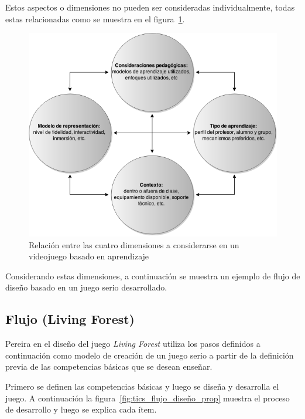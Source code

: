 Estos aspectos o dimensiones no pueden ser consideradas individualmente, todas
estas relacionadas  como se muestra en el
figura~\ref{fig:desarrollo_dimensiones}.

\begin{figure}[H]
\centering
\includegraphics[scale=0.5]{juegos_serios/desarrollo_dimensiones.png}
\caption{Relación entre las cuatro dimensiones a considerarse en un videojuego
    basado en aprendizaje}
\label{fig:desarrollo_dimensiones}
\end{figure}

Considerando estas dimensiones, a continuación se muestra un ejemplo de flujo de
diseño basado en un juego serio desarrollado.


\subsection{Flujo (Living Forest)}


Pereira\cite{pereira2009design} en el diseño del juego \emph{Living Forest}
utiliza los pasos definidos a continuación como modelo de creación de un juego
serio a partir de la definición previa de las competencias básicas que se desean
enseñar.

Primero se definen las competencias básicas y luego se diseña y desarrolla el
juego. A continuación la figura~\ref{fig:tics_flujo_diseño_prop} muestra el
proceso de desarrollo y luego se explica cada ítem.

